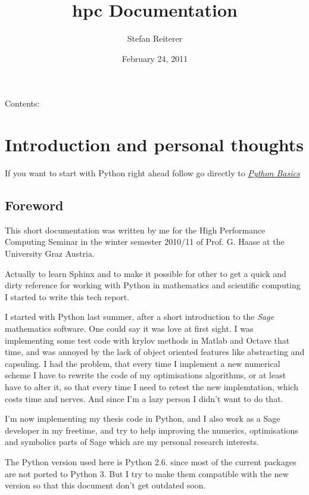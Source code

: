 \documentclass[letterpaper,10pt,english]{manual}
\title{hpc Documentation}
\date{February 24, 2011}
\author{Stefan Reiterer}
\begin{document}
\maketitle
\tableofcontents
\hypertarget{--doc-index}{}


Contents:

\resetcurrentobjects
\hypertarget{--doc-Introduction}{}

\chapter{Introduction and personal thoughts}

If you want to start with Python right ahead  follow go directly to \hyperlink{basics-ref}{\emph{Python Basics}}


\section{Foreword}

This short documentation was written by me for the High Performance Computing Seminar
in the winter semester 2010/11 of Prof. G. Haase at the University Graz Austria.

Actually to learn Sphinx and to make it possible for other to get a quick and dirty reference
for working with Python in mathematics and scientific computing I started to write this tech report.

I started with Python last summer, after a short introduction to the \emph{Sage} mathematics software. One could
say it was love at first sight. I was implementing some test code with krylov methods in Matlab and Octave that
time, and was annoyed by the lack of object oriented features like abstracting and capsuling. I had the problem, that
every time I implement a new numerical scheme I have to rewrite the code of my optimisations algorithms, or at least have
to alter it, so that every time I need to retest the new implemtation, which costs time and nerves. And since I'm a
lazy person I didn't want to do that.

I'm now implementing my thesis code in Python, and I also work as a Sage developer in my freetime, and try to help
improving the numerics, optimisations and symbolics parts of Sage which are my personal research interests.

The Python version used here is Python 2.6. since most of the current packages are not ported to Python 3.
But I try to make them compatible with the new version so that this document don't get outdated soon.
\end{document}
